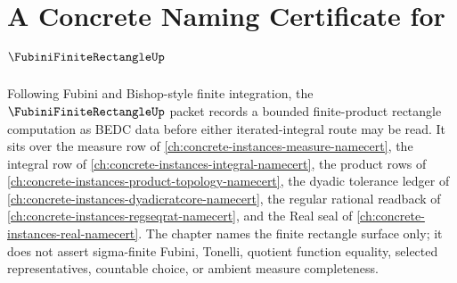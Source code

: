 \chapter{A Concrete Naming Certificate for $\FubiniFiniteRectangleUp$}
\label{ch:concrete-instances-fubini-finite-rectangle-namecert}

Following Fubini and Bishop-style finite integration, the $\FubiniFiniteRectangleUp$ packet records a bounded finite-product rectangle computation as BEDC data before either iterated-integral route may be read. It sits over the measure row of \autoref{ch:concrete-instances-measure-namecert}, the integral row of \autoref{ch:concrete-instances-integral-namecert}, the product rows of \autoref{ch:concrete-instances-product-topology-namecert}, the dyadic tolerance ledger of \autoref{ch:concrete-instances-dyadicratcore-namecert}, the regular rational readback of \autoref{ch:concrete-instances-regseqrat-namecert}, and the Real seal of \autoref{ch:concrete-instances-real-namecert}. The chapter names the finite rectangle surface only; it does not assert sigma-finite Fubini, Tonelli, quotient function equality, selected representatives, countable choice, or ambient measure completeness.

